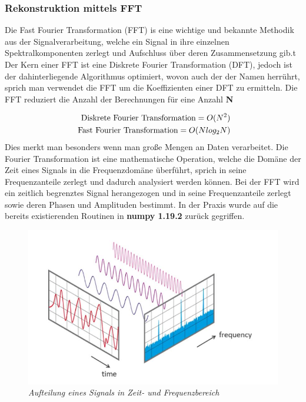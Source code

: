 \documentclass[11pt]{report}
\begin{document}
\subsubsection{Rekonstruktion mittels FFT}
Die Fast Fourier Transformation (FFT) is eine wichtige und bekannte Methodik aus der Signalverarbeitung, welche ein Signal in ihre einzelnen Spektralkomponenten zerlegt und Aufschluss über deren Zusammensetzung gib.t Der Kern einer FFT ist eine Diskrete Fourier Transformation (DFT), jedoch ist der dahinterliegende Algorithmus optimiert, wovon auch der der Namen herrührt, sprich man verwendet die FFT um die Koeffizienten einer DFT zu ermitteln. Die FFT reduziert die Anzahl der Berechnungen für eine Anzahl \textbf{N}

\begin{equation}
\begin{split}
\textnormal{Diskrete Fourier Transformation} = O(N^{2}) \\\
\textnormal{Fast Fourier Transformation} = O(N log_2N)
\end{split}
\end{equation}
Dies merkt man besonders wenn man große Mengen an Daten verarbeitet. Die Fourier Transformation ist eine mathematische Operation, welche die Domäne der Zeit eines Signals in die Frequenzdomäne überführt, sprich in seine Frequenzanteile zerlegt und dadurch analysiert werden können. Bei der FFT wird ein zeitlich begrenztes Signal herangezogen und in seine Frequenzanteile zerlegt sowie deren Phasen und Amplituden bestimmt. In der Praxis wurde auf die bereits existierenden Routinen in \textbf{numpy 1.19.2} zurück gegriffen.
\begin{figure}[H]
\centering
\includegraphics[scale=0.6]{./Grafiken/Fitting/FFT/FFT_time_und_frequenz_anteile.jpg}
\caption{\textit{Aufteilung eines Signals in Zeit- und Frequenzbereich}}
\end{figure}
\end{document}

